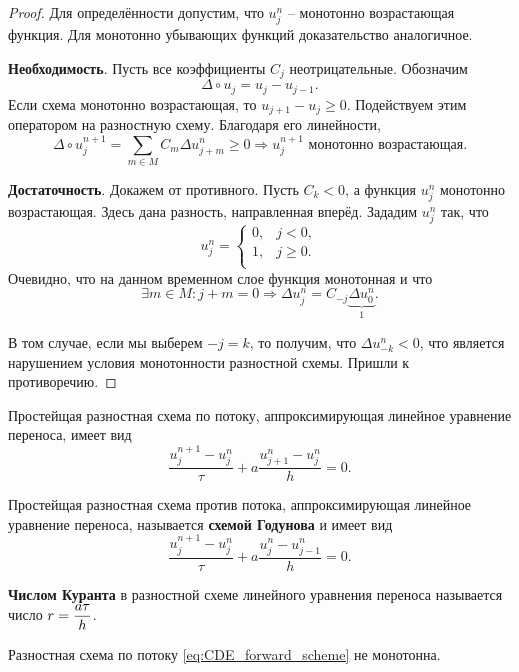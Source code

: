 \documentclass{article}
\begin{document}
\begin{proof}
	Для определённости допустим, что $u_j^n$ -- монотонно возрастающая
	функция. Для монотонно убывающих функций доказательство аналогичное.
	
	\textbf{Необходимость}. Пусть все коэффициенты $C_j$ неотрицательные.
	Обозначим
	\[\Delta\circ u_j=u_j-u_{j-1}.\]
	Если схема монотонно возрастающая, то $u_{j+1}-u_j\ge 0$. Подействуем
	этим оператором на разностную схему. Благодаря его линейности,
	\[\Delta\circ u_j^{n+1}=\sum_{m\in M}C_m\Delta u_{j+m}^{n}\ge 0
	\Rightarrow u_j^{n+1}\text{ монотонно возрастающая}.\]

	\textbf{Достаточность}. Докажем от противного. Пусть $C_k<0$, а функция
	$u_j^n$ монотонно возрастающая. Здесь дана разность, направленная
	вперёд. Зададим $u_j^n$ так, что
	\[
		u_j^n=
		\begin{cases}
			0, & j < 0, \\
			1, & j\ge 0. \\
		\end{cases}
	\]
	Очевидно, что на данном временном слое функция монотонная и что
	\[\exists m\in M:j+m=0\Rightarrow
	\Delta u_j^n=C_{-j}\underset{1}{\underbrace{\Delta u_0^n}}.\]

	В том случае, если мы выберем $-j=k$, то получим, что
	$\Delta u_{-k}^n<0$, что является нарушением условия монотонности
	разностной схемы. Пришли к противоречию.
\end{proof}

\begin{define}\label{eq:CDE_forward_scheme}
	Простейщая разностная схема по потоку, аппроксимирующая линейное
	уравнение переноса, имеет вид
	\[\frac{u_j^{n+1}-u_j^n}{\tau}+a\frac{u_{j+1}^n-u_j^n}{h}=0.\]
\end{define}

\begin{define}\label{eq:godunov_scheme}
	Простейщая разностная схема против потока, аппроксимирующая линейное
	уравнение переноса, называется \textbf{схемой Годунова} и имеет вид
	\[\frac{u_j^{n+1}-u_j^n}{\tau}+a\frac{u_j^n-u_{j-1}^n}{h}=0.\]
\end{define}

\begin{define}\label{eq:courant_number}
	\textbf{Числом Куранта} в разностной схеме линейного уравнения переноса
	называется число $\mathlarger{r=\frac{a\tau}{h}}$.
\end{define}

\begin{lemma}
	Разностная схема по потоку \eqref{eq:CDE_forward_scheme} не монотонна.
\end{lemma}
\end{document}
